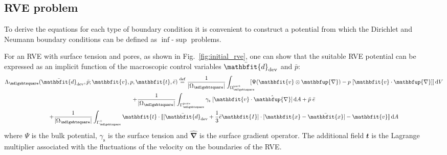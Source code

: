 \documentclass[notitlepage,a4paper,fleqn,9pt]{extarticle}
\renewcommand{\ta}[1]{\mathbfit{#1}}
\renewcommand{\ts}[1]{\mathbfit{#1}}
\renewcommand{\diff}{\mathbfup{\nabla}}
\renewcommand{\Box}{\mdlgwhtsquare}
\newcommand{\volume}{\frac{1}{|\Omega_\Box|}}
\newcommand{\jump}[1]{[\![#1]\!]}
\newcommand{\pore}{\mathrm{pore}}
\newcommand{\particle}{\mathrm{part}}
\newcommand{\surf}{\mathrm{s}}
\newcommand{\figref}[1]{Fig.~\ref{#1}}
\begin{document}
\begin{multicols}{2}
\subsection{RVE problem}
To derive the equations for each type of boundary condition it is convenient to construct a potential from which the Dirichlet and Neumann boundary conditions can be defined as $\inf$-$\sup$ problems.

For an RVE with surface tension and pores, as shown in \figref{fig:initial_rve}, one can show that the suitable RVE potential can be expressed as an implicit function of the macroscopic control variables $\bar{\ts d}_\dev$ and $\bar{p}$:
\begin{multline}
 \Lambda_\Box(\bar{\ts d}_\dev, \bar{p}; \ta v, p, \ta t, \bar{e}) \defeq
     \volume\int_{\Omega_\Box^\particle} \!\!\!\!\![\Psi(\ta v\outerp\diff) - p\;[\ta v\cdot\diff]] \dif V
\\
   + \volume\int_{\Gamma_\Box^\pore} \gamma_\surf \;[\ta v \cdot \hat{\diff}]\dif A
  + \bar{p}\; \bar{e}
\\
  + \volume \int_{\Gamma_\Box^+} \ta t \cdot \jump{[\bar{\ts d}_\dev + \frac13\bar{e}\ts I]\cdot[\ta x - \bar{\ta x}] - \ta v}\dif A
\label{eq:rve_potential}
\end{multline}
where $\Psi$ is the bulk potential, $\gamma_\surf$ is the surface tension and $\hat{\diff}$ is the surface gradient operator.
The additional field $\ta t$ is the Lagrange multiplier associated with the fluctuations of the velocity on the boundaries of the RVE.


\end{multicols}
\end{document}
